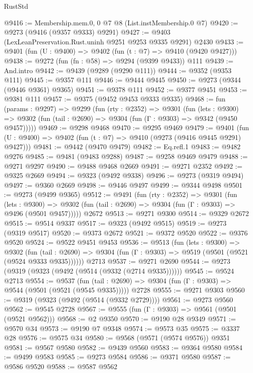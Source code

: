\begin{lexlean}{RustStd}
\begin{coremodule}
{\begin{coremodule}
{{{{{{{{{{{{{{{{{{{{{{{{{{{{{{{{{{{{{{{{{{{{{{{{{{{{{{{@9416 := Membership.mem.{0, 0} @7 @8 (List.instMembership.{0} @7)
@9420 := @9273 (@9416 (@9357 @9333) @9291)
@9427 := @9403 (LexLeanPreservation.Rust.uninh @9251 @9253 @9335 @9291) @2430
@9433 := @9401 (fun (U : @9400) => @9402 (fun (t : @7) => @9410 (@9420 @9427)))
@9438 := @9272 (fun (fn : @58) => @9294 (@9399 @9433)) @111
@9439 := And.intro
@9442 := @9439 (@9289 (@9290 @111))
@9444 := @9352 (@9353 @111)
@9445 := @9357 @111
@9446 := @9444 @9445
@9450 := @9273 (@9344 (@9446 @9361) @9365)
@9451 := @9378 @111
@9452 := @9377 @9451
@9453 := @9381 @111
@9457 := @9375 (@9452 @9453 @9333 @9335)
@9468 := fun (params : @9297) =>
  @9299
    (fun (rty : @2352) =>
    @9301
      (fun (lets : @9300) =>
      @9302 (fun (tail : @2690) => @9304 (fun (Γ : @9303) => @9342 (@9450 @9457)))))
@9469 := @9298 @9468
@9470 := @9295 @9469
@9479 := @9401 (fun (U : @9400) => @9402 (fun (t : @7) => @9410 (@9273 (@9416 @9445 @9291) @9427)))
@9481 := @9442 (@9470 @9479)
@9482 := Eq.refl.{1}
@9483 := @9482 @9276
@9485 := @9481 (@9483 @9288)
@9487 := @9258 @9469 @9479
@9488 := @9271 @9297
@9490 := @9488 @9468 @2669
@9491 := @9271 @2352
@9492 := @9325 @2669
@9494 := @9323 (@9492 @9338)
@9496 := @9273 (@9319 @9494)
@9497 := @9360 @2669
@9498 := @9446 @9497
@9499 := @9344 @9498
@9501 := @9273 (@9499 @9365)
@9512 := @9491
    (fun (rty : @2352) =>
    @9301
      (fun (lets : @9300) =>
      @9302 (fun (tail : @2690) => @9304 (fun (Γ : @9303) => @9496 (@9501 @9457)))))
    @2672
@9513 := @9271 @9300
@9514 := @9329 @2672
@9515 := @9514 @9337
@9517 := @9323 (@9492 @9515)
@9519 := @9273 (@9319 @9517)
@9520 := @9373 @2672
@9521 := @9372 @9520
@9522 := @9376 @9520
@9524 := @9522 @9451 @9453
@9536 := @9513
    (fun (lets : @9300) =>
    @9302
      (fun (tail : @2690) => @9304 (fun (Γ : @9303) => @9519 (@9501 (@9521 (@9524 @9333 @9335))))))
    @2713
@9537 := @9271 @2690
@9544 := @9273 (@9319 (@9323 (@9492 (@9514 (@9332 (@2714 @9335))))))
@9545 := @9524 @2713
@9554 := @9537
    (fun (tail : @2690) => @9304 (fun (Γ : @9303) => @9544 (@9501 (@9521 (@9545 @9335)))))
    @2728
@9555 := @9271 @9303
@9560 := @9319 (@9323 (@9492 (@9514 (@9332 @2729))))
@9561 := @9273 @9560
@9562 := @9545 @2728
@9567 := @9555 (fun (Γ : @9303) => @9561 (@9501 (@9521 @9562)))
@9568 := @2 @9350
@9570 := @9190 @28 @9349
@9571 := @9570 @34
@9573 := @9190 @7 @9348
@9574 := @9573 @35
@9575 := @3337 @28
@9576 := @9575 @34
@9580 := @9568 (@9571 (@9574 @9576)) @9351
@9581 := @9567 @9580
@9582 := @9439 @9560
@9583 := @9364 @9580
@9584 := @9499 @9583
@9585 := @9273 @9584
@9586 := @9371 @9580
@9587 := @9586 @9520
@9588 := @9587 @9562
}}}}}}}}}}}}}}}}}}}}}}}}}}}}}}}}}}}}}}}}}}}}}}}}}}}}}}}
\end{coremodule}}
\end{coremodule}
\end{lexlean}
